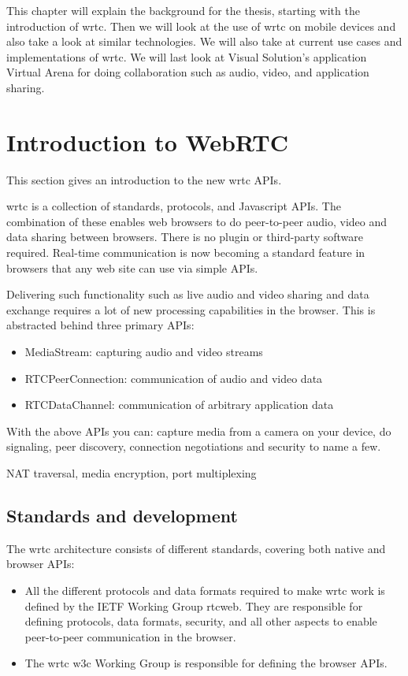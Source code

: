 
This chapter will explain the background for the thesis, starting with the introduction of \gls{wrtc}. Then we will look at the use of \gls{wrtc} on mobile devices and also take a look at similar technologies. We will also take at current use cases and implementations of \gls{wrtc}. We will last look at Visual Solution's application Virtual Arena for doing collaboration such as audio, video, and application sharing.

\section{Introduction to WebRTC}

This section gives an introduction to the new \gls{wrtc} APIs.

\gls{wrtc} is a collection of standards, protocols, and Javascript APIs. The combination of these enables web browsers to do peer-to-peer audio, video and data sharing between browsers. There is no plugin or third-party software required. Real-time communication is now becoming a standard feature in browsers that any web site can use via simple APIs.

Delivering such functionality such as live audio and video sharing and data exchange requires a lot of new processing capabilities in the browser. This is abstracted behind three primary APIs:

\begin{itemize}
\item MediaStream: capturing audio and video streams
\item RTCPeerConnection: communication of audio and video data
\item RTCDataChannel: communication of arbitrary application data
\end{itemize}

With the above APIs you can: capture media from a camera on your device, do signaling, peer discovery, connection negotiations and security to name a few.

NAT traversal, media encryption, port multiplexing

\subsection{Standards and development}
The \gls{wrtc} architecture consists of different standards, covering both native and browser APIs:

\begin{itemize}
\item All the different protocols and data formats required to make \gls{wrtc} work is defined by the IETF Working Group \gls{rtcweb}. They are responsible for defining protocols, data formats, security, and all other aspects to enable peer-to-peer communication in the browser.
\item The \gls{wrtc} \gls{w3c} Working Group is responsible for defining the browser APIs.
\end{itemize}

